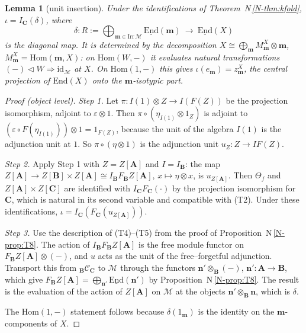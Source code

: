 \documentclass[11pt]{article}
\newtheorem{lemma}[theorem]{Lemma}
\theoremstyle{definition}
\theoremstyle{remark}
\newcommand{\bfB}{\mathbf B}
\newcommand{\bfA}{\mathbf A}
\newcommand{\bfC}{\mathbf C}
\newcommand{\nref}[1]{N\,\ref{N-#1}}
\begin{document}
\begin{lemma}[unit insertion]\label{lem:unitins}
Under the identifications of Theorem~\nref{thm:kfold}, $\iota=I_{\bfC}(\delta)$, where
\[
\delta\colon R:=\bigoplus_{\mathbf m\in\mathrm{Irr}\,\mathcal M}\underline{\mathrm{End}}(\mathbf m)\ \longrightarrow\ \underline{\mathrm{End}}(X)
\]
is the diagonal map. It is determined by the decomposition $X\cong\bigoplus_{\mathbf m}M^X_{\mathbf m}\otimes\mathbf m$, $M^X_{\mathbf m}=\mathrm{Hom}(\mathbf m,X)$: on $\mathrm{Hom}(W,-)$ it evaluates natural transformations $(-)\triangleleft W\Rightarrow\mathrm{id}_{\mathcal M}$ at $X$. On $\mathrm{Hom}(1,-)$ this gives $\iota(e_{\mathbf m})=z^X_{\mathbf m}$, the central projection of $\mathrm{End}(X)$ onto the $\mathbf m$-isotypic part.
\end{lemma}
\begin{proof}[Proof (object level)]
\emph{Step 1.} Let $\pi\colon I(1)\otimes Z\to I(F(Z))$ be the projection isomorphism, adjoint to $\varepsilon\otimes1$. Then $\pi\circ(\eta_{I(1)}\otimes1_Z)$ is adjoint to $(\varepsilon\circ F(\eta_{I(1)}))\otimes1=1_{F(Z)}$, because the unit of the algebra $I(1)$ is the adjunction unit at $1$. So $\pi\circ(\eta\otimes1)$ is the adjunction unit $u_Z\colon Z\to IF(Z)$.

\emph{Step 2.} Apply Step 1 with $Z=Z[\bfA]$ and $I=I_{\bfB}$: the map $Z[\bfA]\to Z[\bfB]\times Z[\bfA]\cong I_{\bfB}F_{\bfB}Z[\bfA]$, $x\mapsto\eta\otimes x$, is $u_{Z[\bfA]}$. Then $\Theta_f$ and $Z[\bfA]\times Z[\bfC]$ are identified with $I_{\bfC}F_{\bfC}(\cdot)$ by the projection isomorphism for $\bfC$, which is natural in its second variable and compatible with (T2). Under these identifications, $\iota=I_{\bfC}(F_{\bfC}(u_{Z[\bfA]}))$.

\emph{Step 3.} Use the description of (T4)--(T5) from the proof of Proposition~\nref{prop:T8}. The action of $I_{\bfB}F_{\bfB}Z[\bfA]$ is the free module functor on $F_{\bfB}Z[\bfA]\otimes(-)$, and $u$ acts as the unit of the free--forgetful adjunction. Transport this from ${}_{\bfB}\mathcal C_{\bfC}$ to $\mathcal M$ through the functors $\mathbf n'\otimes_{\bfB}(-)$, $\mathbf n'\colon\bfA\to\bfB$, which give $F_{\bfB}Z[\bfA]=\bigoplus_{\mathbf n'}\underline{\mathrm{End}}(\mathbf n')$ by Proposition~\nref{prop:T8}. The result is the evaluation of the action of $Z[\bfA]$ on $\mathcal M$ at the objects $\mathbf n'\otimes_{\bfB}\mathbf n$, which is $\delta$.

The $\mathrm{Hom}(1,-)$ statement follows because $\delta(1_{\mathbf m})$ is the identity on the $\mathbf m$-components of $X$.
\end{proof}
\end{document}
